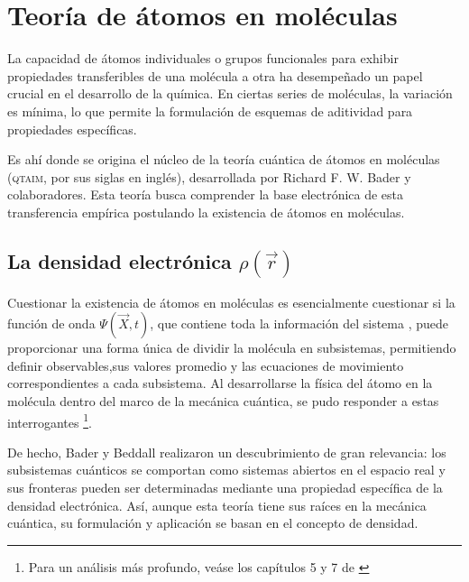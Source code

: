 \section{Teoría de átomos en moléculas}
  La capacidad de átomos individuales o grupos funcionales para exhibir
	propiedades transferibles de una molécula a otra ha desempeñado un papel
	crucial en el desarrollo de la química. En ciertas series de moléculas, la variación es 
	mínima, lo que permite la formulación de esquemas de aditividad para propiedades específicas.

	Es ahí donde se origina el núcleo de la teoría cuántica de átomos en moléculas
	(\textsc{qtaim}, por sus siglas en inglés), desarrollada por Richard F. W. Bader
	y colaboradores. Esta teoría busca comprender la base electrónica de esta 
	transferencia empírica postulando la existencia de átomos en moléculas.
%
\subsection{La densidad electrónica $\rho(\vec{r})$}
  Cuestionar la existencia de átomos en moléculas es esencialmente cuestionar si 
	la función de onda $\Psi(\vec{X}, t)$, que contiene toda la información del sistema 
	\cite{cohen1}, puede proporcionar una forma única de dividir la molécula en subsistemas, 
	permitiendo definir observables,sus valores promedio y las ecuaciones de movimiento 
  correspondientes a cada subsistema. Al desarrollarse la física del átomo en la molécula 
  dentro del marco de la mecánica cuántica, se pudo responder a estas interrogantes 
  \footnote{Para un análisis más profundo, veáse los capítulos 5 y 7 de \cite{badero}}.
		
	De hecho, Bader y Beddall \cite{bader1972} realizaron un descubrimiento de gran relevancia: los 
  subsistemas cuánticos se comportan como sistemas abiertos en el espacio real y sus fronteras 
  pueden ser determinadas mediante una propiedad específica de la densidad electrónica. Así, aunque 
  esta teoría tiene sus raíces en la mecánica cuántica, su formulación y aplicación se basan en el 
  concepto de densidad. 
		
